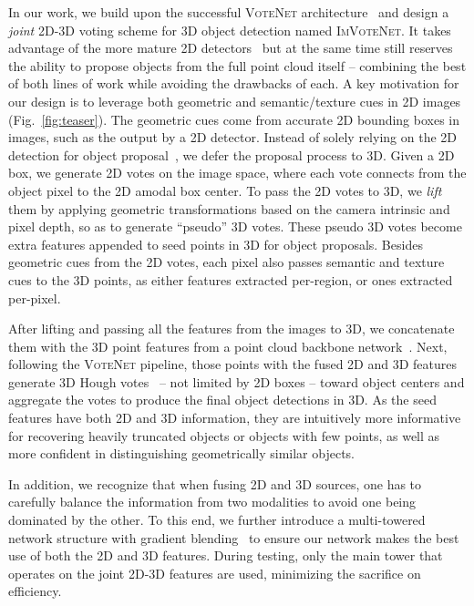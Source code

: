 \documentclass[10pt,twocolumn,letterpaper]{article}
\newcommand{\votenet}{\textsc{VoteNet}\xspace}
\newcommand{\imvotenet}{\textsc{ImVoteNet}\xspace}
\begin{document}
In our work, we build upon the successful \votenet architecture~\cite{voteNet} and design a \emph{joint} 2D-3D voting scheme for 3D object detection named \imvotenet. It takes advantage of the more mature 2D detectors~\cite{ren2015faster} but at the same time still reserves the ability to propose objects from the full point cloud itself -- combining the best of both lines of work while avoiding the drawbacks of each.
A key motivation for our design is to leverage both geometric and semantic/texture cues in 2D images (Fig.~\ref{fig:teaser}). The geometric cues come from accurate 2D bounding boxes in images, such as the output by a 2D detector. Instead of solely relying on the 2D detection for object proposal~\cite{qi2018frustum}, we defer the proposal process to 3D. Given a 2D box, we generate 2D votes on the image space, where each vote connects from the object pixel to the 2D amodal box center. To pass the 2D votes to 3D, we \emph{lift} them by applying geometric transformations based on the camera intrinsic and pixel depth, so as to generate ``pseudo'' 3D votes. These pseudo 3D votes become extra features appended to seed points in 3D for object proposals. Besides geometric cues from the 2D votes, each pixel also passes semantic and texture cues to the 3D points, as either features extracted per-region, or ones extracted per-pixel.

After lifting and passing all the features from the images to 3D, we concatenate them with the 3D point features from a point cloud backbone network~\cite{qi2017pointnet,qi2017pointnetplusplus}. Next, following the \votenet pipeline, those points with the fused 2D and 3D features generate 3D Hough votes~\cite{hough1959machine} -- not limited by 2D boxes -- toward object centers and aggregate the votes to produce the final object detections in 3D. As the seed features have both 2D and 3D information, they are intuitively more informative for recovering heavily truncated objects or objects with few points, as well as more confident in distinguishing geometrically similar objects.

In addition, we recognize that when fusing 2D and 3D sources, one has to carefully balance the information from two modalities to avoid one being dominated by the other. To this end, we further introduce a multi-towered network structure with gradient blending~\cite{wang2019makes} to ensure our network makes the best use of both the 2D and 3D features. During testing, only the main tower that operates on the joint 2D-3D features are used, minimizing the sacrifice on efficiency. 
\end{document}
